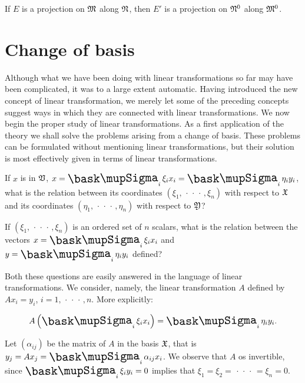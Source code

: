 \begin{theorem}
    If \(E\) is a projection on \(\frak{M}\) along \(\frak{N}\), then \(E'\) is
    a projection on \(\frak{N}^0\) along \(\frak{M}^0\).
\end{theorem}

\section{Change of basis}

Although what we have been doing with linear transformations so far may have
been complicated, it was to a large extent automatic. Having introduced the new
concept of linear transformation, we merely let some of the preceding concepts
suggest ways in which they are connected with linear transformations. We now
begin the proper study of linear transformations. As a first application of the
theory we shall solve the problems arising from a change of basis. These
problems can be formulated without mentioning linear transformations, but their
solution is most effectively given in terms of linear transformations.

\begin{question}
    If \(x\) is in \(\mathfrak{V}\), \(x = \sumx_i \xi_i x_i = \sumx_i \eta_i y_i\),
    what is the relation between its coordinates \((\xi_1,
    \,\cdot\,\cdot\,\cdot\,, \xi_n)\) with respect to \(\frak{X}\) and its
    coordinates \((\eta_1, \,\cdot\,\cdot\,\cdot\,, \eta_n)\) with respect to
    \(\frak{Y}\)?
\end{question}

\begin{question}
    If \((\xi_1, \,\cdot\,\cdot\,\cdot\,, \xi_n)\) is an ordered set of \(n\)
    scalars, what is the relation between the vectors \(x = \sumx_i \xi_i x_i\)
    and \(y = \sumx_i \eta_i y_i\) defined?
\end{question}

Both these questions are easily answered in the language of linear
transformations. We consider, namely, the linear transformation \(A\) defined by
\(Ax_i = y_i\), \(i = 1, \,\cdot\,\cdot\,\cdot\,, n\). More explicitly:

\begin{equation*}
    A\left(\sumx_i \xi_i x_i\right) = \sumx_i \eta_i y_i.
\end{equation*}

Let \((\alpha_{ij})\) be the matrix of \(A\) in the basis \(\frak{X}\), that is
\(y_j = Ax_j = \sumx_i \alpha_{ij} x_i\). We observe that \(A\) os invertible,
since \(\sumx_i \xi_i y_i = 0\) implies that \(\xi_1 = \xi_2 =
\,\cdot\,\cdot\,\cdot\, = \xi_n = 0\).

